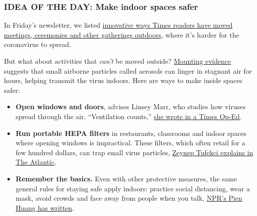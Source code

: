 \hypertarget{idea-of-the-day-make-indoor-spaces-safer}{%
\subsubsection{\texorpdfstring{\textbf{IDEA OF THE DAY: Make indoor
spaces
safer}}{IDEA OF THE DAY: Make indoor spaces safer}}\label{idea-of-the-day-make-indoor-spaces-safer}}

In Friday's newsletter, we listed
\href{https://www.nytimes3xbfgragh.onion/2020/07/30/briefing/move-everything-outdoors-our-readers-respond.html}{innovative
ways Times readers have moved meetings, ceremonies and other gatherings
outdoors}, where it's harder for the coronavirus to spread.

But what about activities that \emph{can't} be moved outside?
\href{https://www.nytimes3xbfgragh.onion/2020/07/09/health/virus-aerosols-who.html}{Mounting
evidence} suggests that small airborne particles called aerosols can
linger in stagnant air for hours, helping transmit the virus indoors.
Here are ways to make inside spaces safer:

\begin{itemize}
\tightlist
\item
  \textbf{Open windows and doors}, advises Linsey Marr, who studies how
  viruses spread through the air. ``Ventilation counts,''
  \href{https://www.nytimes3xbfgragh.onion/2020/07/30/opinion/coronavirus-aerosols.html}{she
  wrote in a Times Op-Ed}.
\end{itemize}

\begin{itemize}
\tightlist
\item
  \textbf{Run portable HEPA filters} in restaurants, classrooms and
  indoor spaces where opening windows is impractical. These filters,
  which often retail for a few hundred dollars, can trap small virus
  particles,
  \href{https://www.theatlantic.com/health/archive/2020/07/why-arent-we-talking-more-about-airborne-transmission/614737/}{Zeynep
  Tufekci explains in The Atlantic}.
\end{itemize}

\begin{itemize}
\tightlist
\item
  \textbf{Remember the basics.} Even with other protective measures, the
  same general rules for staying safe apply indoors: practice social
  distancing, wear a mask, avoid crowds and face away from people when
  you talk,
  \href{https://www.npr.org/sections/goatsandsoda/2020/07/11/889716534/coronavirus-faq-how-do-i-protect-myself-if-the-coronavirus-can-linger-in-the-air}{NPR's
  Pien Huang has written}.
\end{itemize}

